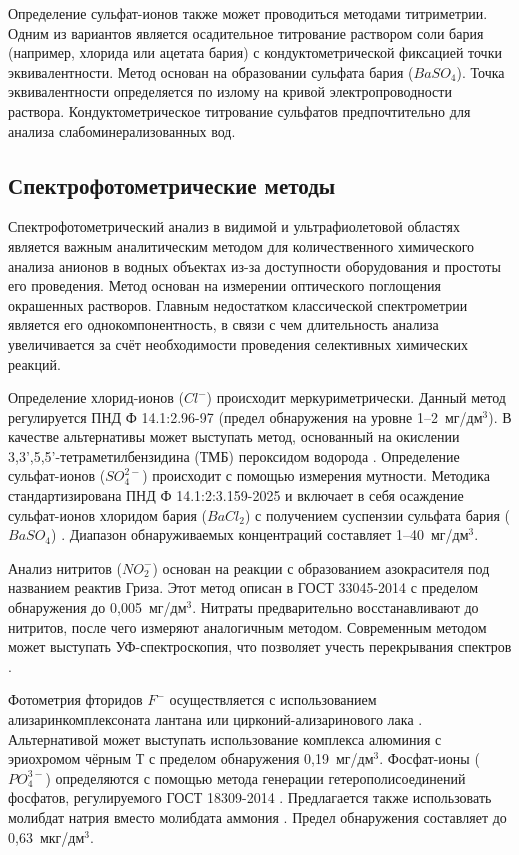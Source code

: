 Определение сульфат-ионов также может проводиться методами титриметрии. Одним из вариантов является осадительное титрование раствором соли бария (например, хлорида или ацетата бария) с кондуктометрической фиксацией точки эквивалентности. Метод основан на образовании сульфата бария ($BaSO_4$). Точка эквивалентности определяется по излому на кривой электропроводности раствора. Кондуктометрическое титрование сульфатов предпочтительно для анализа слабоминерализованных вод.

\subsection{Спектрофотометрические методы}

Спектрофотометрический анализ в видимой и ультрафиолетовой областях является важным аналитическим методом для количественного химического анализа анионов в водных объектах из-за доступности оборудования и простоты его проведения. Метод основан на измерении оптического поглощения окрашенных растворов. Главным недостатком классической спектрометрии является его однокомпонентность, в связи с чем длительность анализа увеличивается за счёт необходимости проведения селективных химических реакций.

Определение хлорид-ионов ($Cl^-$) происходит меркуриметрически. Данный метод регулируется ПНД Ф 14.1:2.96-97 \cite{pndf14129697} (предел обнаружения на уровне 1--2~мг/дм$^3$). В качестве альтернативы может выступать метод, основанный на окислении 3,3',5,5'-тетраметилбензидина (ТМБ) пероксидом водорода \cite{vasconcelosChlorideCatalyticDetermination2025}. Определение сульфат-ионов ($SO_4^{2-}$) происходит с помощью измерения мутности. Методика стандартизирована ПНД Ф 14.1:2:3.159-2025 \cite{pndf141231592025} и включает в себя осаждение сульфат-ионов хлоридом бария ($BaCl_2$) с получением суспензии сульфата бария ($BaSO_4$) \cite{jannahAnalasisKonsentrasiIon2021}. Диапазон обнаруживаемых концентраций составляет 1--40~мг/дм$^3$.

Анализ нитритов ($NO_2^-$) основан на реакции с образованием азокрасителя под названием реактив Гриза. Этот метод описан в ГОСТ 33045-2014 \cite{gost330452014} с пределом обнаружения до 0,005~мг/дм$^3$. Нитраты предварительно восстанавливают до нитритов, после чего измеряют аналогичным методом. Современным методом может выступать УФ-спектроскопия, что позволяет учесть перекрывания спектров \cite{chenUltravioletSpectroscopicDetection2021}.

Фотометрия фторидов $F^-$ осуществляется с использованием ализаринкомплексоната лантана или цирконий-ализаринового лака \cite{gost438689}. Альтернативой может выступать использование комплекса алюминия с эриохромом чёрным Т \cite{mariamSpectroscopicDeterminationFluoride2021} с пределом обнаружения 0,19~мг/дм$^3$. Фосфат-ионы ($PO_4^{3-}$) определяются с помощью метода генерации гетерополисоединений фосфатов, регулируемого ГОСТ 18309-2014 \cite{gost183092014}. Предлагается также использовать молибдат натрия вместо молибдата аммония \cite{linSpectrophotometricDeterminationPhosphate2025}. Предел обнаружения составляет до 0,63~мкг/дм$^3$.

